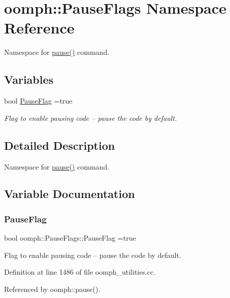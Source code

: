 \hypertarget{namespaceoomph_1_1PauseFlags}{}\section{oomph\+:\+:Pause\+Flags Namespace Reference}
\label{namespaceoomph_1_1PauseFlags}


Namespace for \hyperlink{namespaceoomph_a4a82243b0ce4c28469a290fe2d7cd2c4}{pause()} command.  


\subsection*{Variables}
\begin{DoxyCompactItemize}
\item 
bool \hyperlink{namespaceoomph_1_1PauseFlags_a52e5878afedbb6929fb6db45d14c1c20}{Pause\+Flag} =true
\begin{DoxyCompactList}\small\item\em Flag to enable pausing code -- pause the code by default. \end{DoxyCompactList}\end{DoxyCompactItemize}


\subsection{Detailed Description}
Namespace for \hyperlink{namespaceoomph_a4a82243b0ce4c28469a290fe2d7cd2c4}{pause()} command. 

\subsection{Variable Documentation}
\mbox{\label{namespaceoomph_1_1PauseFlags_a52e5878afedbb6929fb6db45d14c1c20}} 
\subsubsection{\texorpdfstring{Pause\+Flag}{PauseFlag}}
{\footnotesize\ttfamily bool oomph\+::\+Pause\+Flags\+::\+Pause\+Flag =true}



Flag to enable pausing code -- pause the code by default. 



Definition at line 1486 of file oomph\+\_\+utilities.\+cc.



Referenced by oomph\+::pause().

